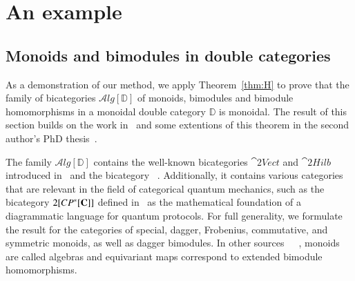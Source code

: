 \section{An example}\label{sec:Alg} 

\subsection*{Monoids and bimodules in double categories}
\label{sec:mod}

As a demonstration of our method, we apply Theorem~\ref{thm:H} to prove that the family of bicategories $\mathcal{A}lg[{\mathbb{D}}]$ of monoids, bimodules and bimodule homomorphisms in a monoidal double category $\mathbb{D}$ is monoidal. The result of this section builds on the work in~\cite[Theorem 11.5]{shulman:frbi} and some extentions of this theorem in the second author's PhD thesis~\cite[Chapter 5]{westerthesis}.

The family $\mathcal{A}lg[{\mathbb{D}}]$ contains the well-known bicategories $\cat{2Vect}$ and $\cat{2Hilb}$  introduced in~\cite{kapranov562,baez2004higher} and the bicategory ~\cite{?}. Additionally, it contains various categories that are relevant in the field of categorical quantum mechanics, such as the bicategory $2[CP^*[{\bf C}]]$ defined in~\cite{heunenvicarywester} as the mathematical foundation of a diagrammatic language for quantum protocols. For full generality, we formulate the result for the categories of special, dagger, Frobenius, commutative, and symmetric monoids, as well as dagger bimodules.
In other sources~\cite{westerthesis}~\cite{jamiesbook}~\cite{heunenvicarywester},  monoids are called algebras and equivariant maps correspond to extended bimodule homomorphisms. 


